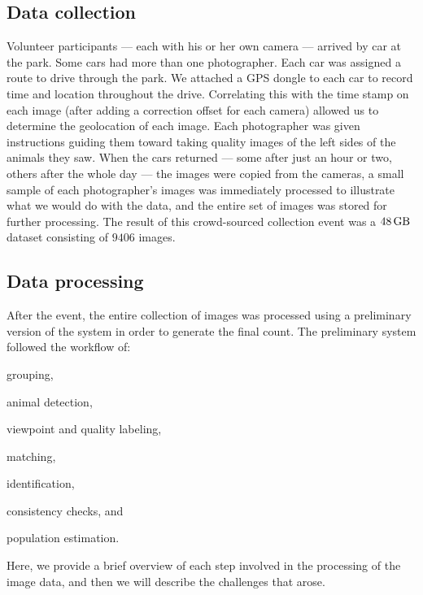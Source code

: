     \subsection{Data collection}
        Volunteer participants --- each with his or her own camera --- arrived by car at the park.
        Some cars had more than one photographer.
        Each car was assigned a route to drive through the park.
        We attached a GPS dongle to each car to record time and location throughout the drive.
        Correlating this with the time stamp on each image (after adding a correction offset for each camera)
          allowed us to determine the geolocation of each image.
        Each photographer was given instructions guiding them toward taking quality images of the left sides of
          the animals they saw.
        When the cars returned --- some after just an hour or two, others after the whole day --- the images were
          copied from the cameras, a small sample of each photographer's images was immediately processed to
          illustrate what we would do with the data, and the entire set of images was stored for further
          processing.
        The result of this crowd-sourced collection event was a $\SI{48}{\giga\byte}$ dataset consisting of
          $9406$ images.

    \subsection{Data processing}\label{subsec:introdataprocess}

        After the event, the entire collection of images was processed using a preliminary version of the system in
        order to generate the final count. The preliminary system followed the workflow of: %
        \begin{enumin}
            \item \occurrence{} grouping,  %
            \item animal detection, %
            \item viewpoint and quality labeling,  %
            \item \intraoccurrence{} matching, %
            \item \vsexemplar{} identification, %
            \item consistency checks,  and %
            \item population estimation.  %
        \end{enumin}
        Here, we provide a brief overview of each step involved in the processing of the \GZC{} image data, and then we
        will describe the challenges that arose.

